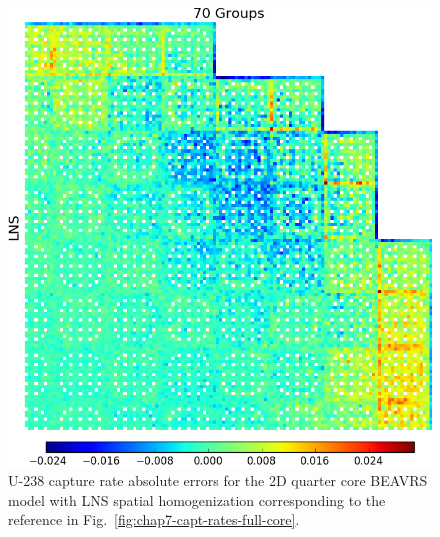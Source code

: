 \begin{appendices}
\begin{figure}[h!]
\centering
\includegraphics[width=\linewidth]{figures/patterns/appendix/full-core/capt-err-lns-magnitude}
\vspace{2mm}
\caption[U-238 capture rate absolute errors for BEAVRS]{U-238 capture rate absolute errors for the 2D quarter core \ac{BEAVRS} model with \ac{LNS} spatial homogenization corresponding to the reference in Fig.~\ref{fig:chap7-capt-rates-full-core}.}
\label{fig:lns-full-core-capt-err-abs}
\end{figure}

\clearpage



\end{appendices}
